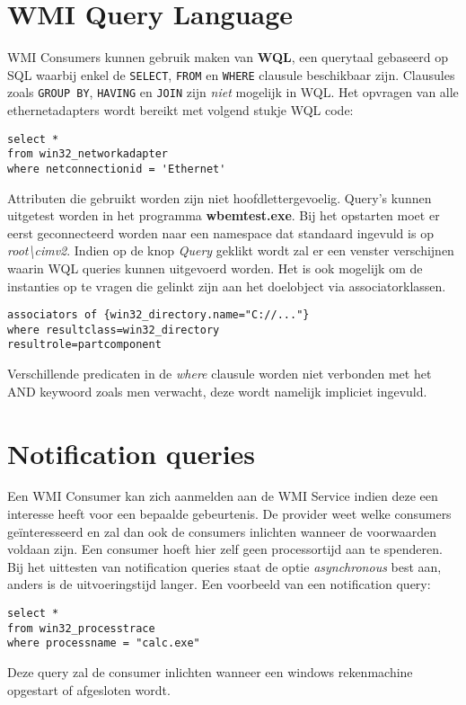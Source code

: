 \documentclass{report}
\begin{document}
	\section{WMI Query Language}
	WMI Consumers kunnen gebruik maken van \textbf{WQL}, een querytaal gebaseerd op SQL waarbij enkel de \texttt{SELECT}, \texttt{FROM} en \texttt{WHERE} clausule beschikbaar zijn. Clausules zoals \texttt{GROUP BY}, \texttt{HAVING} en \texttt{JOIN} zijn \textit{niet} mogelijk in WQL. Het opvragen van alle ethernetadapters wordt bereikt met volgend stukje WQL code:
	\begin{lstlisting}
select * 
from win32_networkadapter
where netconnectionid = 'Ethernet'
	\end{lstlisting}
	Attributen die gebruikt worden zijn niet hoofdlettergevoelig. Query's kunnen uitgetest worden in het programma \textbf{wbemtest.exe}. Bij het opstarten moet er eerst geconnecteerd worden naar een namespace dat standaard ingevuld is op \textit{root\textbackslash cimv2}. Indien op de knop \textit{Query} geklikt wordt zal er een venster verschijnen waarin WQL queries kunnen uitgevoerd worden. Het is ook mogelijk om de instanties op te vragen die gelinkt zijn aan het doelobject via associatorklassen.
	
	
	\begin{lstlisting}
associators of {win32_directory.name="C://..."}
where resultclass=win32_directory
resultrole=partcomponent
	\end{lstlisting}
	Verschillende predicaten in de \textit{where} clausule worden niet verbonden met het AND keywoord zoals men verwacht, deze wordt namelijk impliciet ingevuld.
	\section{Notification queries}
	Een WMI Consumer kan zich aanmelden aan de WMI Service indien deze een interesse heeft voor een bepaalde gebeurtenis. De provider weet welke consumers geïnteresseerd en zal dan ook de consumers inlichten wanneer de voorwaarden voldaan zijn. Een consumer hoeft hier zelf geen processortijd aan te spenderen. Bij het uittesten van notification queries staat de optie \textit{asynchronous} best aan, anders is de uitvoeringstijd langer. Een voorbeeld van een notification query:
	\begin{lstlisting}
select * 
from win32_processtrace
where processname = "calc.exe"
	\end{lstlisting}
	Deze query zal de consumer inlichten wanneer een windows rekenmachine opgestart of afgesloten wordt.
	
\end{document}
